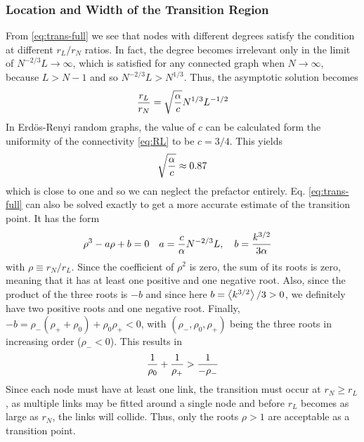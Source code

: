 \documentclass[11pt]{article}
\begin{document}
\subsubsection{Location and Width of the Transition Region}
From \eqref{eq:trans-full} we see that nodes with different degrees satisfy the condition at different $r_L/r_N$ ratios. 
In fact, the degree becomes irrelevant only in the limit of $N^{-2/3} L \to \infty$, which is satisfied for any connected graph when $N\to \infty$, because $L> N-1$ and so $N^{-2/3} L > N^{1/3}$.  
Thus, the asymptotic solution becomes
\begin{align}
    {r_L\over r_N} = \sqrt{{\alpha \over c}}%
    N^{1/3}L^{-1/2} %
\end{align}
In Erd\"os-Renyi random graphs, the value of $c$ can be calculated form the uniformity of the connectivity \eqref{eq:RL} to be $c=3/4$. This yields 
\[ \sqrt{{\alpha \over c}} \approx 0.87 \]
which is close to one and so we can neglect the prefactor entirely. 
Eq. \eqref{eq:trans-full} can also be solved exactly to get a more accurate estimate of the transition point. 
It has the form 
\begin{align}
    &\rho^3 - a \rho + b =0 & a&= {c\over \alpha} N^{-2/3} L ,
    \quad b={ k^{3/2}\over 3\alpha } 
    \label{eq:rhoab}
\end{align}
with $\rho \equiv r_N/r_L$.
Since the coefficient of $\rho^2$ is zero, the sum of its roots is zero, meaning that it has at least one positive and one negative root.
Also, since the product of the three roots is $-b$ and since here $b= \left<k^{3/2}\right>/3>0$, we definitely have two positive roots and one negative root. 
Finally, $-b = \rho_-(\rho_++\rho_0) +\rho_0\rho_+ <0$, with $(\rho_-,\rho_0,\rho_+)$ being the three roots in increasing order ($\rho_-<0$). 
This results in 
\[{1\over \rho_0} + {1\over \rho_+} > {1\over -\rho_-}\]
Since each node must have at least one link, the transition must occur at $r_N \geq r_L$, as multiple links may be fitted around a single node and before $r_L$ becomes as large as $r_N$, the links will collide. 
Thus, only the roots $\rho > 1$ are acceptable as a transition point. 
\end{document}
